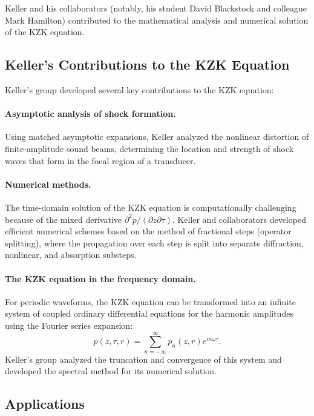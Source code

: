 Keller and his collaborators (notably, his student David Blackstock and colleague Mark Hamilton) contributed to the mathematical analysis and numerical solution of the KZK equation.

\subsection{Keller's Contributions to the KZK Equation}

Keller's group developed several key contributions to the KZK equation:

\paragraph{Asymptotic analysis of shock formation.} Using matched asymptotic expansions, Keller analyzed the nonlinear distortion of finite-amplitude sound beams, determining the location and strength of shock waves that form in the focal region of a transducer.

\paragraph{Numerical methods.} The time-domain solution of the KZK equation is computationally challenging because of the mixed derivative \(\partial^2 p/(\partial z \partial \tau)\). Keller and collaborators developed efficient numerical schemes based on the method of fractional steps (operator splitting), where the propagation over each step is split into separate diffraction, nonlinear, and absorption substeps.

\paragraph{The KZK equation in the frequency domain.} For periodic waveforms, the KZK equation can be transformed into an infinite system of coupled ordinary differential equations for the harmonic amplitudes using the Fourier series expansion:
\[
p(z, \tau, r) = \sum_{n=-\infty}^\infty p_n(z, r) e^{i n \omega \tau}.
\]
Keller's group analyzed the truncation and convergence of this system and developed the spectral method for its numerical solution.

\subsection{Applications}

